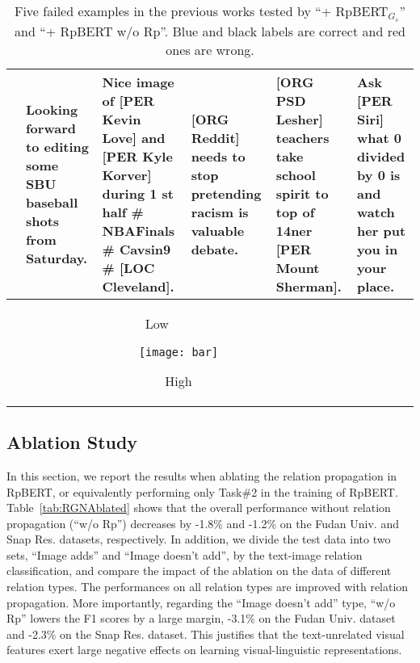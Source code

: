 \documentclass[letterpaper]{article} \usepackage{aaai21}  \usepackage{times}  \usepackage{helvet} \usepackage{courier}  \usepackage[hyphens]{url}  \usepackage{graphicx} \urlstyle{rm} \def\UrlFont{\rm}  \usepackage{natbib}  \usepackage{caption} \frenchspacing  \setlength{\pdfpagewidth}{8.5in}  \setlength{\pdfpageheight}{11in}
\begin{document}
\begin{table*}[!h]
\begin{tabular}{|m{}|m{}|m{}|m{}|m{}|m{}|}
		& Looking forward to editing some \textbf{{\color{red}SBU}} baseball shots from Saturday. \textit{\cite{lu2018visual}}
		& Nice image of \textbf{[PER Kevin Love]} and \textbf{[PER Kyle Korver]} during 1 st half \# NBAFinals \# Cavsin9 \# {\color{red}\textbf{[LOC Cleveland]}}. \textit{\cite{lu2018visual}}
		&  {\color{red}\textbf{[ORG Reddit]}} needs to stop pretending racism is valuable debate. \textit{\cite{arshad2019aiding}}
		&  {\color{blue}\textbf{[ORG PSD Lesher]}} teachers take school spirit to top of 14ner  {\color{red}\textbf{[PER Mount Sherman]}}. \textit{\cite{arshad2019aiding}}
					& Ask {\color{red}\textbf{[PER Siri]}} what 0 divided by 0 is and watch her put you in your place. \textit{\cite{yu2020improving}}\\
		\hline
		
		\multicolumn{5}{c}{		 \hspace{7em}  Low ~~~~~~\begin{minipage}[p]{0.29\textwidth}
				\vspace{0.6em} 	\texttt{[image: bar]}
			\end{minipage} High}\\
		
	\end{tabular}
		\caption{Five failed examples in the previous works tested by  ``+ RpBERT$_{G_s}$'' and ``+ RpBERT w/o Rp''. Blue and black labels are correct and red ones are wrong.}\label{tab:case}
\end{table*}





\subsection{Ablation Study}



In this section, we report the results when ablating the relation propagation in  RpBERT,
or equivalently  performing only Task\#2  in the training of  RpBERT.
Table~\ref{tab:RGNAblated} shows that the overall performance without relation propagation (``w/o Rp'') decreases by -1.8\% and -1.2\% on the Fudan Univ. and Snap Res. datasets, respectively.
In addition, we divide the test data into two sets, ``Image adds'' and ``Image doesn't add'', by the text-image relation classification, and compare the impact of the ablation on the data of different relation types.
The performances on all relation types are improved with relation propagation.
More importantly, regarding the ``Image doesn't add'' type, ``w/o Rp'' lowers the F1 scores by a large margin, -3.1\% on the Fudan Univ. dataset and -2.3\% on the Snap Res. dataset.
This justifies that the text-unrelated visual features exert large negative effects on learning visual-linguistic representations.
\end{document}
